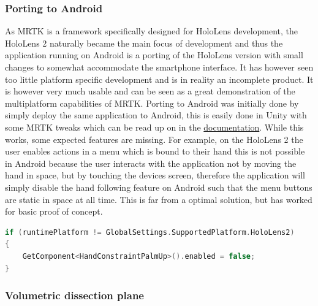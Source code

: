 \subsubsection*{Porting to Android}

As MRTK is a framework specifically designed for HoloLens development, the HoloLens 2 naturally became the main focus of development and thus the application running on Android is a porting of the HoloLens version with small changes to somewhat accommodate the smartphone interface. It has however seen too little platform specific development and is in reality an incomplete product. It is however very much usable and can be seen as a great demonstration of the multiplatform capabilities of MRTK. 
Porting to Android was initially done by simply deploy the same application to Android, this is easily done in Unity with some MRTK tweaks which can be read up on in the \href{https://microsoft.github.io/MixedRealityToolkit-Unity/version/releases/2.2.0/Documentation/CrossPlatform/UsingARFoundation.html}{documentation}. While this works, some expected features are missing. For example, on the HoloLens 2 the user enables actions in a menu which is bound to their hand this is not possible in Android because the user interacts with the application not by moving the hand in space, but by touching the devices screen, therefore the application will simply disable the hand following feature on Android such that the menu buttons are static in space at all time. This is far from a optimal solution, but has worked for basic proof of concept. 
\begin{lstlisting}[language=c]
if (runtimePlatform != GlobalSettings.SupportedPlatform.HoloLens2)
{
    GetComponent<HandConstraintPalmUp>().enabled = false;
}
\end{lstlisting}



\subsubsection*{Volumetric dissection plane}





